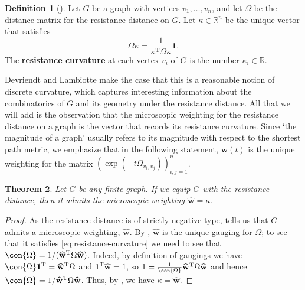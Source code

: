 \documentclass[a4paper, oneside, reqno]{amsart}
\newtheorem{theorem}{Theorem}[section]
\theoremstyle{definition}
\newtheorem{definition}[theorem]{Definition}
\theoremstyle{remark}
\numberwithin{equation}{section}
\renewcommand{\vec}{\mathbf}
\newcommand{\onevector}{\mathbf{1}}
\newcommand{\transpose}{\mathrm{T}}
\newcommand{\R}{\mathbb{R}}
\newcommand{\define}{\textbf}
\newcommand{\micro}{\widehat{\vec{w}}}
\begin{document}
\begin{definition}[{\cite[Definition~1 and Appendix~B2]{DevriendtLambiotte}}]
\label{def:resistance-curvature}
Let \(G\) be a graph with vertices \(v_1,\ldots, v_n\), and let \(\Omega\) be the distance matrix for the resistance distance on \(G\). Let \(\kappa \in \R^n\) be the unique vector that satisfies 
\begin{equation}
\label{eq:resistance-curvature}
\Omega \kappa = \frac{1}{\kappa^\transpose \Omega \kappa} \onevector.
\end{equation}
The \define{resistance curvature} at each vertex \(v_i\) of \(G\) is the number \(\kappa_i \in \R\).
\end{definition}

Devriendt and Lambiotte make the case that this is a reasonable notion of discrete curvature, which captures interesting information about the combinatorics of \(G\) and its geometry under the resistance distance. All that we will add is the observation that the microscopic weighting for the resistance distance on a graph is the vector that records its resistance curvature. Since `the magnitude of a graph' usually refers to its magnitude with respect to the shortest path metric, we emphasize that in the following statement, \(\vec{w}(t)\) is the unique weighting for the matrix \(\left(\exp(-t\Omega_{v_i,v_j})\right)_{i,j=1}^n\).

\begin{theorem}
\label{thm:microwtg-curvature}
Let \(G\) be any finite graph. If we equip \(G\) with the resistance distance, then it admits the microscopic weighting
\(\micro = \kappa\).
\end{theorem}

\begin{proof}
As the resistance distance is of strictly negative type,  tells us that \(G\) admits a microscopic weighting, \(\micro\). By , \(\micro\) is the unique gauging for \(\Omega\); to see that it satisfies \eqref{eq:resistance-curvature} we need to see that \(\con{\Omega} = 1/(\micro^\transpose \Omega \micro)\). Indeed, by definition of gaugings we have \(\con{\Omega} \onevector^\transpose = \micro^\transpose \Omega\) and \(\onevector^\transpose \micro = 1\), so \(1 = \frac{1}{\con{\Omega}} \micro^\transpose \Omega \micro\) and hence \(\con{\Omega} = 1/\micro^\transpose \Omega \micro\). Thus, by , we have \(\kappa = \micro\).
\end{proof}
\end{document}
